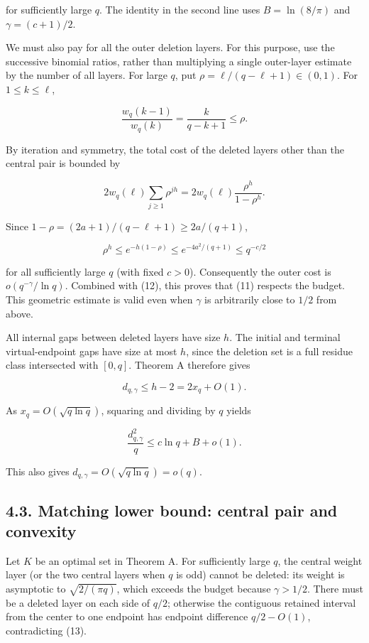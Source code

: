 \documentclass[
  10pt,
]{article}
\begin{document}
for sufficiently large \(q\). The identity in the second line uses \(B=\ln(8/\pi)\) and \(\gamma=(c+1)/2\).

We must also pay for all the outer deletion layers. For this purpose, use the successive binomial ratios, rather than multiplying a single outer-layer estimate by the number of all layers. For large \(q\), put \(\rho=\ell/(q-\ell+1)\in(0,1)\). For \(1\le k\le\ell\),

\[
 \frac{w_q(k-1)}{w_q(k)}=\frac{k}{q-k+1}\le\rho.
\]

By iteration and symmetry, the total cost of the deleted layers other than the central pair is bounded by

\[
 2w_q(\ell)\sum_{j\ge1}\rho^{jh}
 =2w_q(\ell)\frac{\rho^h}{1-\rho^h}.
\]

Since \(1-\rho=(2a+1)/(q-\ell+1)\ge 2a/(q+1)\),

\[
 \rho^h\le e^{-h(1-\rho)}
          \le e^{-4a^2/(q+1)}
          \le q^{-c/2}
\]

for all sufficiently large \(q\) (with fixed \(c>0\)). Consequently the outer cost is \(o(q^{-\gamma}/\ln q)\). Combined with (12), this proves that (11) respects the budget. This geometric estimate is valid even when \(\gamma\) is arbitrarily close to \(1/2\) from above.

All internal gaps between deleted layers have size \(h\). The initial and terminal virtual-endpoint gaps have size at most \(h\), since the deletion set is a full residue class intersected with \([0,q]\). Theorem A therefore gives

\[
 d_{q,\gamma}\le h-2=2x_q+O(1).
\]

As \(x_q=O(\sqrt{q\ln q})\), squaring and dividing by \(q\) yields

\[
 \frac{d_{q,\gamma}^2}{q}\le c\ln q+B+o(1).\tag{13}
\]

This also gives \(d_{q,\gamma}=O(\sqrt{q\ln q})=o(q)\).

\subsection{4.3. Matching lower bound: central pair and convexity}\label{matching-lower-bound-central-pair-and-convexity}

Let \(K\) be an optimal set in Theorem A. For sufficiently large \(q\), the central weight layer (or the two central layers when \(q\) is odd) cannot be deleted: its weight is asymptotic to \(\sqrt{2/(\pi q)}\), which exceeds the budget because \(\gamma>1/2\). There must be a deleted layer on each side of \(q/2\); otherwise the contiguous retained interval from the center to one endpoint has endpoint difference \(q/2-O(1)\), contradicting (13).
\end{document}
